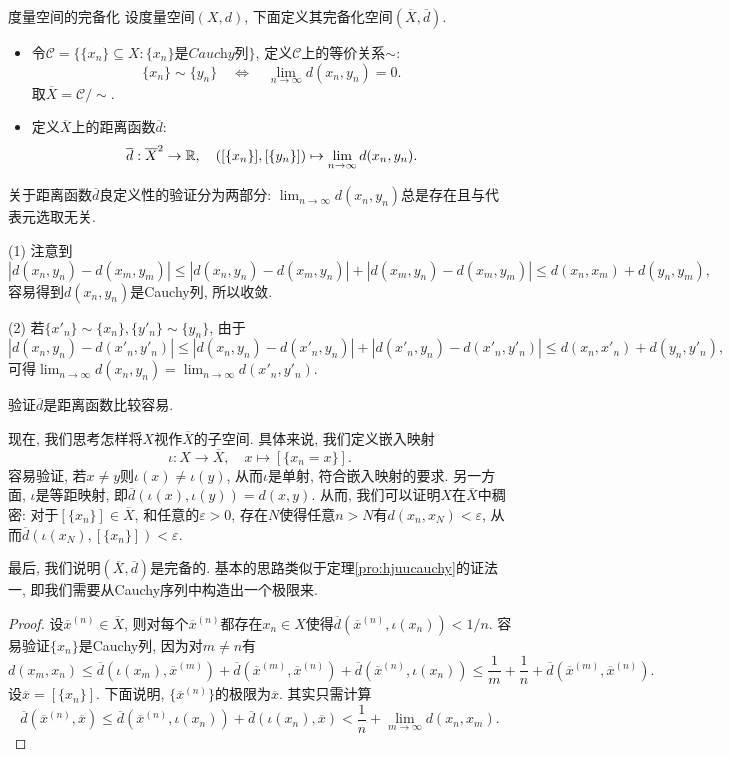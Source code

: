 \begin{definition}{度量空间的完备化}
	设度量空间$(X,d)$, 下面定义其完备化空间$(\overline{X},\overline{d})$. 
	
	\begin{itemize}
		\item 令$\mathcal{C} = \{ \{ x_n \} \subseteq X: \textit{$\{ x_n \}$是Cauchy列} \}$, 定义$\mathcal{C}$上的等价关系$\sim$: $$\{ x_n \} \sim \{ y_n \} \quad \Leftrightarrow \quad \lim_{n\to \infty} d(x_n,y_n)=0.$$
		取$\overline{X} = \mathcal{C} / \sim$. 
		\item 定义$\overline{X}$上的距离函数$\overline{d}$: $$\overline{d} : \overline{X}^2 \to \mathbb{R},\quad ([\{ x_n \}], [\{ y_n \}]) \mapsto \lim_{n\to \infty} d(x_n,y_n). $$
	\end{itemize}
\end{definition}
\begin{remark}
	关于距离函数$\overline{d}$良定义性的验证分为两部分: $\lim_{n\to \infty} d(x_n,y_n)$总是存在且与代表元选取无关. 
	
	(1) 注意到$$|d(x_n,y_n) - d(x_m,y_m)| \leq |d(x_n,y_n)-d(x_m,y_n)|+|d(x_m,y_n)-d(x_m,y_m)| \leq d(x_n,x_m)+d(y_n,y_m), $$
	容易得到$d(x_n,y_n)$是Cauchy列, 所以收敛. 
	
	(2) 若$\{ x'_n \} \sim \{ x_n \}, \{ y'_n \} \sim \{ y_n \}$, 由于$$|d(x_n,y_n) - d(x'_n,y'_n)| \leq |d(x_n,y_n) - d(x'_n,y_n)| + |d(x'_n,y_n) - d(x'_n,y'_n)| \leq d(x_n,x'_n) + d(y_n,y'_n), $$
	可得$\lim_{n\to \infty} d(x_n,y_n) = \lim_{n\to \infty} d(x'_n,y'_n)$. 
\end{remark}

验证$\overline{d}$是距离函数比较容易. 

现在, 我们思考怎样将$X$视作$\overline{X}$的子空间. 具体来说, 我们定义嵌入映射$$\iota : X \to \overline{X},\quad x \mapsto [\{ x_n=x \}]. $$
容易验证, 若$x\neq y$则$\iota (x) \neq \iota (y)$, 从而$\iota$是单射, 符合嵌入映射的要求. 另一方面, $\iota$是等距映射, 即$\overline{d} (\iota (x),\iota (y)) = d(x,y)$. 从而, 我们可以证明$X$在$\overline{X}$中稠密: 对于$[\{ x_n \}] \in \overline{X}$, 和任意的$\varepsilon >0$, 存在$N$使得任意$n>N$有$d(x_n,x_N)<\varepsilon$, 从而$\overline{d} (\iota (x_N),[\{ x_n \}]) < \varepsilon$. 

最后, 我们说明$(\overline{X}, \overline{d})$是完备的. 基本的思路类似于定理\ref{pro:hjuucauchy}的证法一, 即我们需要从Cauchy序列中构造出一个极限来. 

\begin{proof}
	设$\overline{x}^{(n)} \in \overline{X}$, 则对每个$\overline{x}^{(n)}$都存在$x_n \in X$使得$\overline{d}(\overline{x}^{(n)},\iota (x_n))<1/n$. 容易验证$\{ x_n \}$是Cauchy列, 因为对$m \neq n$有$$d(x_m,x_n) \leq \overline{d} (\iota (x_m), \overline{x}^{(m)}) + \overline{d} (\overline{x}^{(m)}, \overline{x}^{(n)}) + \overline{d} (\overline{x}^{(n)}, \iota (x_n)) \leq \frac{1}{m} + \frac{1}{n} + \overline{d} (\overline{x}^{(m)}, \overline{x}^{(n)}). $$
	设$\overline{x} = [\{ x_n \}]$. 下面说明, $\{ \overline{x}^{(n)} \}$的极限为$\overline{x}$. 其实只需计算$$\overline{d} (\overline{x}^{(n)} , \overline{x}) \leq \overline{d}(\overline{x}^{(n)},\iota (x_n)) + \overline{d}(\iota (x_n),\overline{x}) < \frac{1}{n} + \lim_{m\to \infty} d(x_n,x_m). $$
\end{proof}

